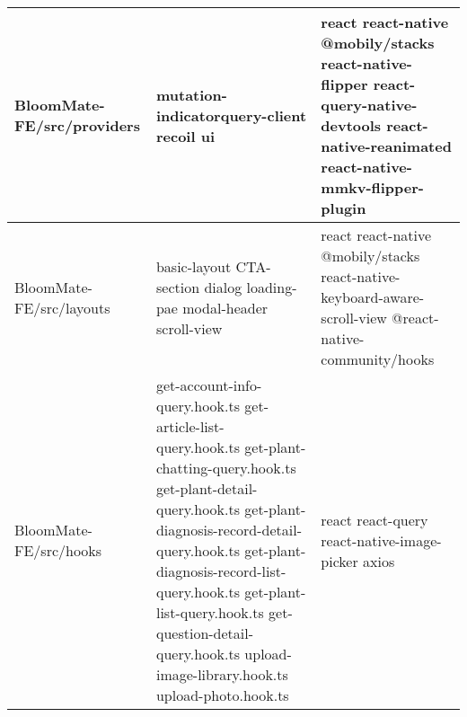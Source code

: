 \documentclass[conference, a4paper]{IEEEtran}
\begin{document}
\begin{table} [htp]
\begin{tabular}{p{1.7cm}|p{2.8cm}|p{2.5cm}}
\hline
 BloomMate-FE\newline/src/providers & mutation-indicator\newline query-client \newline recoil \newline ui  & react  \newline  react-native \newline  @mobily/stacks \newline  react-native-flipper \newline  react-query-native-devtools \newline  react-native-reanimated \newline  react-native-mmkv-flipper-plugin \\
 \hline
 BloomMate-FE\newline/src/layouts & basic-layout \newline CTA-section \newline dialog \newline loading-pae
 \newline modal-header \newline scroll-view & react \newline react-native \newline @mobily/stacks \newline react-native-keyboard-aware-scroll-view \newline @react-native-community/hooks \\
 \hline
  BloomMate-FE\newline/src/hooks & get-account-info-query.hook.ts  \newline  get-article-list-query.hook.ts
 \newline get-plant-chatting-query.hook.ts \newline get-plant-detail-query.hook.ts \newline get-plant-diagnosis-record-detail-query.hook.ts \newline get-plant-diagnosis-record-list-query.hook.ts \newline get-plant-list-query.hook.ts \newline get-question-detail-query.hook.ts \newline upload-image-library.hook.ts \newline upload-photo.hook.ts & react \newline react-query \newline react-native-image-picker \newline axios \\ 
 \hline
    \end{tabular}
\end{table}
\end{document}
